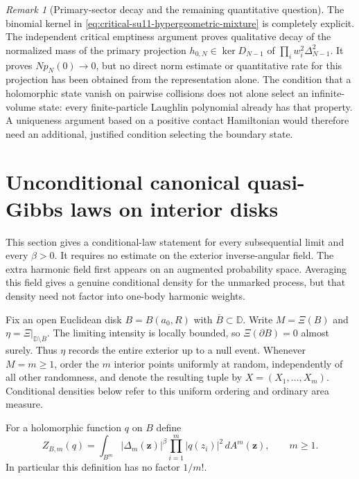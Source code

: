\documentclass[11pt,a4paper]{article}
\numberwithin{equation}{section}
\theoremstyle{definition}
\theoremstyle{remark}
\newtheorem{remark}[theorem]{Remark}
\newcommand{\D}{\mathbb D}
\begin{document}
\begin{remark}[Primary-sector decay and the remaining quantitative question]
The binomial kernel in \eqref{eq:critical-su11-hypergeometric-mixture}
is completely explicit. The independent critical emptiness argument
proves qualitative decay of the normalized mass of the primary projection
$h_{0,N}\in\ker D_{N-1}$ of
$\prod_iw_i^2\Delta_{N-1}^2$.
It proves $Np_N(0)\to0$, but no direct norm estimate or quantitative
rate for this projection has been obtained from the representation alone.
The condition that a holomorphic state vanish on pairwise collisions
does not alone select an infinite-volume state: every finite-particle
Laughlin polynomial already has that property. A uniqueness argument
based on a positive contact Hamiltonian would therefore need an
additional, justified condition selecting the boundary state.
\end{remark}


\section{Unconditional canonical quasi-Gibbs laws on interior disks}
\label{sec:unconditional-canonical-quasigibbs}

This section gives a conditional-law statement for every subsequential
limit and every $\beta>0$. It requires no estimate on the exterior
inverse-angular field. The extra harmonic field first appears on an
augmented probability space. Averaging this field gives a genuine
conditional density for the unmarked process, but that density need not
factor into one-body harmonic weights.

Fix an open Euclidean disk $B=B(a_0,R)$ with $\overline B\subset\D$.
Write $M=\Xi(B)$ and $\eta=\Xi|_{\D\setminus\overline B}$.
The limiting intensity is locally bounded, so $\Xi(\partial B)=0$
almost surely. Thus $\eta$ records the entire exterior up to a null
event. Whenever $M=m\ge1$, order the $m$ interior points uniformly
at random, independently of all other randomness, and denote the
resulting tuple by $X=(X_1,\ldots,X_m)$. Conditional densities below
refer to this uniform ordering and ordinary area measure.

For a holomorphic function $q$ on $B$ define
\[
 Z_{B,m}(q)=\int_{B^m}|\Delta_m(\mathbf z)|^\beta
                          \prod_{i=1}^m|q(z_i)|^2\,dA^m(\mathbf z),
 \qquad m\ge1.
\]
In particular this definition has no factor $1/m!$.
\end{document}
